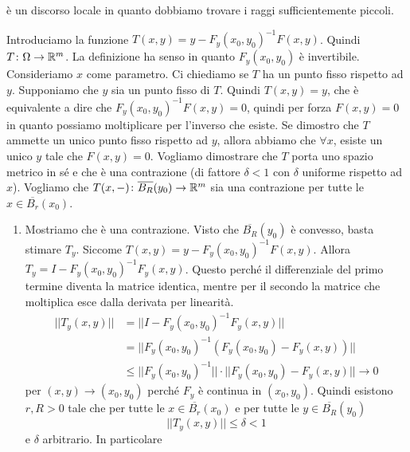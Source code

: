 \documentclass[a4paper]{article}
\begin{document}
\begin{radioactive}
è un discorso locale in quanto dobbiamo trovare i raggi sufficientemente piccoli.

\begin{snippetproof}{}
    Introduciamo la funzione \(T(x,y) = y - F_y(x_0, y_0)^{-1} F(x,y)\).
    Quindi \(T \colon \Omega \to \mathbb{R}^m\).
    La definizione ha senso in quanto \(F_y(x_0,y_0)\) è invertibile.
    Consideriamo \(x\) come parametro.
    Ci chiediamo se \(T\) ha un punto fisso rispetto ad \(y\).
    Supponiamo che \(y\) sia un punto fisso di \(T\).
    Quindi \(T(x,y)=y\),
    che è equivalente a dire che \(F_y(x_0,y_0)^{-1} F(x,y) = 0\),
    quindi per forza \(F(x,y)=0\) in quanto possiamo moltiplicare per l'inverso che esiste.
    Se dimostro che \(T\) ammette un unico punto fisso rispetto ad \(y\),
    allora abbiamo che \(\forall x\), esiste un unico \(y\) tale che \(F(x,y) = 0\).
    Vogliamo dimostrare che \(T\) porta uno spazio metrico in sé e che è una contrazione
    (di fattore \(\delta < 1\) con \(\delta\) uniforme rispetto ad \(x\)).
    Vogliamo che \(T(x, -) \colon \overline{B_R}(y_0) \to \mathbb{R}^m\)
    sia una contrazione per tutte le \(x\in \overline{B_r}(x_0)\).
    \begin{enumerate}
        \item Mostriamo che è una contrazione.
            Visto che \(\overline{B_R}(y_0)\) è convesso, basta stimare \(T_y\).
            Siccome \(T(x,y) = y- F_y(x_0,y_0)^{-1}F(x,y)\). Allora \(T_y = I - F_y(x_0,y_0)^{-1}F_y(x,y)\).
            Questo perché il differenziale del primo termine diventa la matrice identica,
            mentre per il secondo la matrice che moltiplica esce dalla derivata per linearità.
            \begin{align*}
                ||T_y(x,y)|| &= ||I - F_y(x_0, y_0)^{-1} F_y(x,y)|| \\
                &= ||F_y(x_0, y_0)^{-1} (F_y(x_0, y_0) - F_y(x,y)) || \\
                &\leq ||F_y(x_0, y_0)^{-1}|| \cdot ||F_y(x_0, y_0) - F_y(x,y)||
                \to 0
            \end{align*}
            per \((x,y) \to (x_0, y_0)\) perché \(F_y\)
            è continua in \((x_0, y_0)\).
            Quindi esistono \(r, R> 0\) tale che per tutte le \(x \in \overline{B_r}(x_0)\)
            e per tutte le \(y \in \overline{B_R}(y_0)\)
            \[
                ||T_y(x,y)|| \leq \delta < 1
            \]
            e \(\delta\) arbitrario.
            In particolare

\end{enumerate}
\end{snippetproof}
\end{radioactive}
\end{document}
